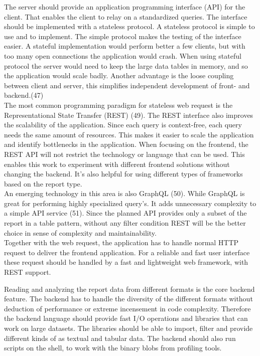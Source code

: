 \documentclass[american,a4paper,oneside,,tablecaptionabove]{scrbook}
\begin{document}
The server should provide an application programming interface (API) for
the client. That enables the client to relay on a standardized queries.
The interface should be implemented with a stateless protocol. A
stateless protocol is simple to use and to implement. The simple
protocol makes the testing of the interface easier. A stateful
implementation would perform better a few clients, but with too many
open connections the application would crash. When using stateful
protocol the server would need to keep the large data tables in memory,
and so the application would scale badly. Another advantage is the loose
coupling between client and server, this simplifies independent
development of front- and backend.(47)\\
The most common programming paradigm for stateless web request is the
Representational State Transfer (REST) (49). The REST interface also
improves the scalability of the application. Since each query is
context-free, each query needs the same amount of resources. This makes
it easier to scale the application and identify bottlenecks in the
application. When focusing on the frontend, the REST API will not
restrict the technology or language that can be used. This enables this
work to experiment with different frontend solutions without changing
the backend. It's also helpful for using different types of frameworks
based on the report type.\\
An emerging technology in this area is also GraphQL (50). While GraphQL
is great for performing highly specialized query's. It adds unnecessary
complexity to a simple API service (51). Since the planned API provides
only a subset of the report in a table pattern, without any filter
condition REST will be the better choice in sense of complexity and
maintainability.\\
Together with the web request, the application has to handle normal HTTP
request to deliver the frontend application. For a reliable and fast
user interface these request should be handled by a fast and lightweight
web framework, with REST support.

Reading and analyzing the report data from different formats is the core
backend feature. The backend has to handle the diversity of the
different formats without deduction of performance or extreme
incensement in code complexity. Therefore the backend language should
provide fast I/O operations and libraries that can work on large
datasets. The libraries should be able to import, filter and provide
different kinds of as textual and tabular data. The backend should also
run scripts on the shell, to work with the binary blobs from profiling
tools.
\end{document}
